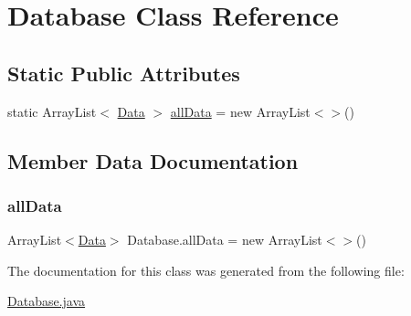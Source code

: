 \hypertarget{class_database}{}\section{Database Class Reference}
\label{class_database}
\subsection*{Static Public Attributes}
\begin{DoxyCompactItemize}
\item 
static Array\+List$<$ \hyperlink{class_data}{Data} $>$ \hyperlink{class_database_a3452b90eeadc0c854bd314663a599dde}{all\+Data} = new Array\+List$<$$>$()
\end{DoxyCompactItemize}


\subsection{Member Data Documentation}
\hypertarget{class_database_a3452b90eeadc0c854bd314663a599dde}{}\label{class_database_a3452b90eeadc0c854bd314663a599dde} 
\subsubsection{\texorpdfstring{all\+Data}{allData}}
{\footnotesize\ttfamily Array\+List$<$\hyperlink{class_data}{Data}$>$ Database.\+all\+Data = new Array\+List$<$$>$()\hspace{0.3cm}{\ttfamily [static]}}



The documentation for this class was generated from the following file\+:\begin{DoxyCompactItemize}
\item 
\hyperlink{_database_8java}{Database.\+java}\end{DoxyCompactItemize}

